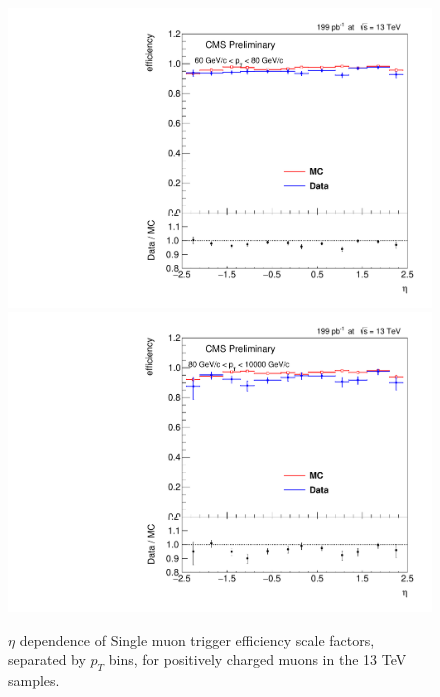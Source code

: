 \begin{figure}
\includegraphics[width=0.45\linewidth]{plots/efficiency/13_zmmhlt_positive/PtBins_eta_pt10.pdf}
\includegraphics[width=0.45\linewidth]{plots/efficiency/13_zmmhlt_positive/PtBins_eta_pt11.pdf}
\caption{$\eta$ dependence of Single muon trigger efficiency scale factors, separated by $p_T$ bins, for positively charged muons in the 13 TeV samples.}
\label{fig:Eff:mu:13:HLT:pos}
\end{figure}
